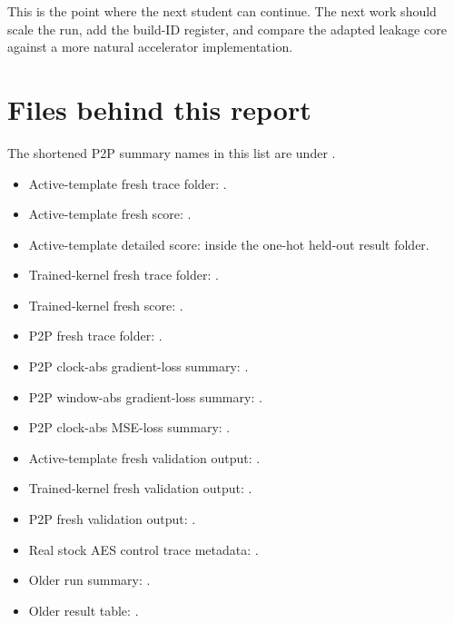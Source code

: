\documentclass[11pt]{article}
\begin{document}
This is the point where the next student can continue. The next work should
scale the run, add the build-ID register, and compare the adapted leakage core
against a more natural accelerator implementation.

\section*{Files behind this report}

The shortened P2P summary names in this list are under
.

\small
\begin{itemize}
  \item Active-template fresh trace folder:
  .
  \item Active-template fresh score:
  .
  \item Active-template detailed score:
   inside the one-hot held-out result folder.
  \item Trained-kernel fresh trace folder:
  .
  \item Trained-kernel fresh score:
  .
  \item P2P fresh trace folder:
  .
  \item P2P clock-abs gradient-loss summary:
  .
  \item P2P window-abs gradient-loss summary:
  .
  \item P2P clock-abs MSE-loss summary:
  .
  \item Active-template fresh validation output:
  .
  \item Trained-kernel fresh validation output:
  .
  \item P2P fresh validation output:
  .
  \item Real stock AES control trace metadata:
  .
  \item Older run summary:
  .
  \item Older result table:
  .
\end{itemize}
\end{document}
